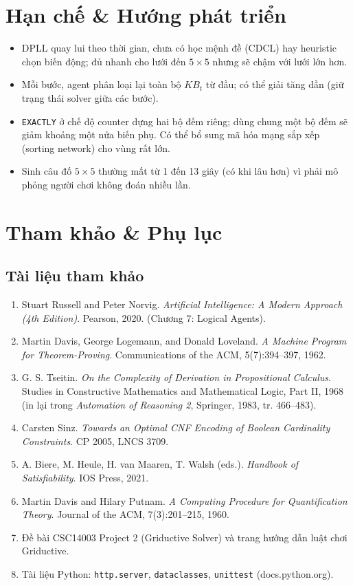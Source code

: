 \documentclass{article}
\newcommand{\code}[1]{\texttt{#1}}
\newcommand{\KB}{\mathit{KB}}
\begin{document}
\section{Hạn chế \& Hướng phát triển}
\begin{itemize}[noitemsep]
    \item DPLL quay lui theo thời gian, chưa có học mệnh đề (CDCL) hay heuristic chọn biến động; đủ nhanh cho lưới đến $5\times5$ nhưng sẽ chậm với lưới lớn hơn.
    \item Mỗi bước, agent phân loại lại toàn bộ $\KB_t$ từ đầu; có thể giải tăng dần (giữ trạng thái solver giữa các bước).
    \item \code{EXACTLY} ở chế độ counter dựng hai bộ đếm riêng; dùng chung một bộ đếm sẽ giảm khoảng một nửa biến phụ. Có thể bổ sung mã hóa mạng sắp xếp (sorting network) cho vùng rất lớn.
    \item Sinh câu đố $5\times5$ thường mất từ 1 đến 13 giây (có khi lâu hơn) vì phải mô phỏng người chơi không đoán nhiều lần.
\end{itemize}

\section{Tham khảo \& Phụ lục}

\subsection{Tài liệu tham khảo}
\begin{enumerate}[noitemsep]
    \item Stuart Russell and Peter Norvig. \textit{Artificial Intelligence: A Modern Approach (4th Edition)}. Pearson, 2020. (Chương 7: Logical Agents).
    \item Martin Davis, George Logemann, and Donald Loveland. \textit{A Machine Program for Theorem-Proving}. Communications of the ACM, 5(7):394--397, 1962.
    \item G. S. Tseitin. \textit{On the Complexity of Derivation in Propositional Calculus}. Studies in Constructive Mathematics and Mathematical Logic, Part II, 1968 (in lại trong \textit{Automation of Reasoning 2}, Springer, 1983, tr. 466--483).
    \item Carsten Sinz. \textit{Towards an Optimal CNF Encoding of Boolean Cardinality Constraints}. CP 2005, LNCS 3709.
    \item A. Biere, M. Heule, H. van Maaren, T. Walsh (eds.). \textit{Handbook of Satisfiability}. IOS Press, 2021.
    \item Martin Davis and Hilary Putnam. \textit{A Computing Procedure for Quantification Theory}. Journal of the ACM, 7(3):201--215, 1960.
    \item Đề bài CSC14003 Project 2 (Griductive Solver) và trang hướng dẫn luật chơi Griductive.
    \item Tài liệu Python: \code{http.server}, \code{dataclasses}, \code{unittest} (docs.python.org).
\end{enumerate}
\end{document}
